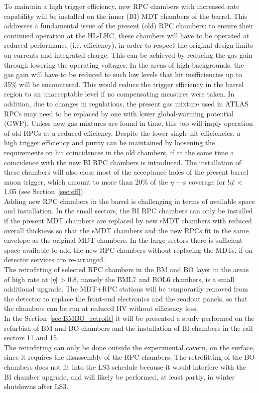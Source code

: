 \noindent To maintain a high trigger efficiency, new RPC chambers with increased rate capability will be installed on the inner (BI) MDT chambers of the barrel. This addresses a fundamental issue
of the present (old) RPC chambers: to ensure their continued operation at the HL-LHC,
these chambers will have to be operated at reduced performance (i.e. efficiency), in order to
respect the original design limits on currents and integrated charge. This can be achieved
by reducing the gas gain through lowering the operating voltages. In the areas of high
backgrounds, the gas gain will have to be reduced to such low levels that hit inefficiencies
up to 35\% will be encountered. This would reduce the trigger efficiency in the barrel region
to an unacceptable level if no compensating measures were taken. In addition, due
to changes in regulations, the present gas mixture used in ATLAS RPCs may need to be
replaced by one with lower global-warming potential (GWP). Unless new gas mixtures are
found in time, this too will imply operation of old RPCs at a reduced efficiency. Despite
the lower single-hit efficiencies, a high trigger efficiency and purity can be maintained by
loosening the requirements on hit coincidences in the old chambers, if at the same time a
coincidence with the new BI RPC chambers is introduced. The installation of these chambers
will also close most of the acceptance holes of the present barrel muon trigger, which
amount to more than 20\% of the $\eta-\phi$ coverage for $!\eta!$ < 1.05 (see Section~\ref{sec:eff}).\\

\noindent Adding new RPC chambers in the barrel is challenging in terms of available space and
installation. In the small sectors, the BI RPC chambers can only be installed if the present
MDT chambers are replaced by new sMDT chambers with reduced overall thickness so that
the sMDT chambers and the new RPCs fit in the same envelope as the original MDT chambers.
In the large sectors there is sufficient space available to add the new RPC chambers
without replacing the MDTs, if on-detector services are re-arranged.\\
The retrofitting of selected RPC chambers in the BM and BO layer in the areas of high
rate at $|\eta|$ > 0.8, namely the BML7 and BOL6 chambers, is a small additional upgrade. The
MDT+RPC stations will be temporarily removed from the detector to replace the front-end
electronics and the readout panels, so that the chambers can be run at reduced HV without
efficiency loss. \\
In the Section~\ref{sec:BMBO_retrofit} it will be presented a study performed on the refurbish of
BM and BO chambers and the installation of BI chambers in the rail sectors 11 and 15.\\
The retrofitting can only be done outside the experimental cavern, on the
surface, since it requires the disassembly of the RPC chambers. The retrofitting of the BO
chambers does not fit into the LS3 schedule because it would interfere with the BI chamber
upgrade, and will likely be performed, at least partly, in winter shutdowns after LS3.\\


